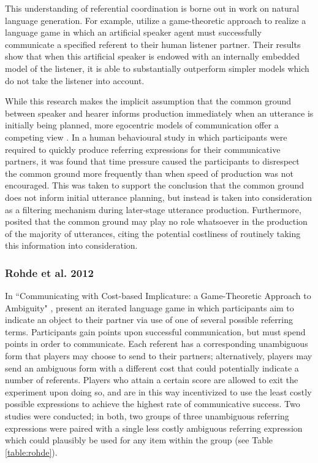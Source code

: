 \documentclass[12pt,a4paper]{article}
\begin{document}
This understanding of referential coordination is borne out in work on natural language generation. For example, \cite{golland2010} utilize a game-theoretic approach to realize a language game in which an artificial speaker agent must successfully communicate a specified referent to their human listener partner. Their results show that when this artificial speaker is endowed with an internally embedded model of the listener, it is able to substantially outperform simpler models which do not take the listener into account.

While this research makes the implicit assumption that the common ground between speaker and hearer informs production immediately when an utterance is initially being planned, more egocentric models of communication offer a competing view \citep{horton1996}. In a human behavioural study in which participants were required to quickly produce referring expressions for their communicative partners, it was found that time pressure caused the participants to disrespect the common ground more frequently than when speed of production was not encouraged. This was taken to support the conclusion that the common ground does not inform initial utterance planning, but instead is taken into consideration as a filtering mechanism during later-stage utterance production. Furthermore, \citeauthor{horton1996} posited that the common ground may play no role whatsoever in the production of the majority of utterances, citing the potential costliness of routinely taking this information into consideration.

\subsubsection{Rohde et al. 2012}
In ``Communicating with Cost-based Implicature: a Game-Theoretic Approach to Ambiguity" \citeyearpar{rohde2012}, \citeauthor{rohde2012} present an iterated language game in which participants aim to indicate an object to their partner via use of one of several possible referring terms. Participants gain points upon successful communication, but must spend points in order to communicate. Each referent has a corresponding unambiguous form that players may choose to send to their partners; alternatively, players may send an ambiguous form with a different cost that could potentially indicate a number of referents. Players who attain a certain score are allowed to exit the experiment upon doing so, and are in this way incentivized to use the least costly possible expressions to achieve the highest rate of communicative success. Two studies were conducted; in both, two groups of three unambiguous referring expressions were paired with a single less costly ambiguous referring expression which could plausibly be used for any item within the group (see Table \ref{table:rohde}). 
\end{document}
